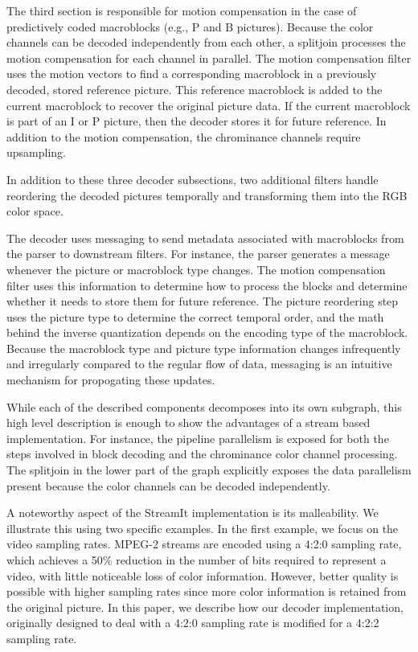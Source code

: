 The third section is responsible for motion compensation in the case of
predictively coded macroblocks (e.g., P and B pictures). Because the
color channels can be decoded independently from each other, a
splitjoin processes the motion compensation for each channel in
parallel. The motion compensation filter uses the motion vectors to find
a corresponding macroblock in a previously decoded, stored 
reference picture. This reference macroblock is added to the current
macroblock to recover the original picture data. If the current macroblock
is part of an I or P picture, then the decoder stores it for future
reference. In addition to the motion compensation, the chrominance
channels require upsampling.

In addition to these three decoder subsections, two additional filters handle
reordering the decoded pictures temporally and transforming them into the
RGB color space.

The decoder uses messaging to send metadata associated with macroblocks
from the parser to downstream filters. For instance, the parser generates
a message whenever the picture or macroblock type changes. The motion
compensation filter uses this information to determine how to process
the blocks and determine whether it needs to store them for future
reference. The picture reordering step uses the picture type to 
determine the correct temporal order, and the math behind the inverse
quantization depends on the encoding type of the macroblock. Because
the macroblock type and picture type information changes infrequently
and irregularly compared to the regular flow of data, messaging is an
intuitive mechanism for propogating these updates.

While each of the described components decomposes into its own 
subgraph, this high level description is enough to show the advantages
of a stream based implementation. For instance, the pipeline 
parallelism is exposed for both the steps involved in block decoding 
and the chrominance color channel processing. The splitjoin in the lower
part of the graph explicitly exposes the data parallelism present because
the color channels can be decoded independently. 



A noteworthy aspect of the StreamIt implementation is its
malleability. We illustrate this using two specific examples.  In the
first example, we focus on the video sampling rates. MPEG-2 streams
are encoded using a 4:2:0 sampling rate, which achieves a 50\%
reduction in the number of bits required to represent a video, with
little noticeable loss of color information. However, better quality
is possible with higher sampling rates since more color information is
retained from the original picture. In this paper, we describe how our
decoder implementation, originally designed to deal with a 4:2:0
sampling rate is modified for a 4:2:2 sampling rate.

